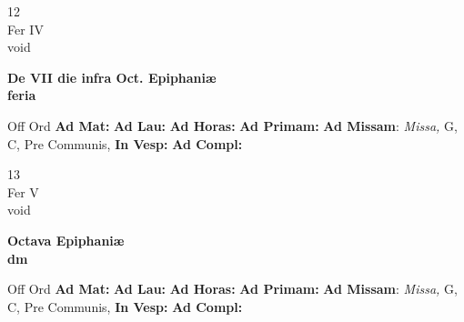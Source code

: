 \documentclass[10pt, openany]{book}
\begin{document}
    \begin{center}
        \begin{minipage}{3.5in}
            \vspace{2em}
            \begin{minipage}{0.5in}
                {\Huge 12} \\
                {\normalsize Fer IV} \\
                {\normalsize void}
            \end{minipage}
            \begin{minipage}{3.0in}
                \textbf{ \large De VII die infra Oct. Epiphaniæ \\
                \textnormal{\normalsize feria}} \\ 
            \end{minipage}
            \begin{justify}Off Ord
                \textbf{Ad Mat: }
                \textbf{Ad Lau: }
                \textbf{Ad Horas: }
                \textbf{Ad Primam: }\textbf{Ad Missam}: \textit{Missa,} G, C, Pre Communis,  
                \textbf{In Vesp: }
                \textbf{Ad Compl: }
            \end{justify}
        \end{minipage}
    \end{center}

    \begin{center}
        \begin{minipage}{3.5in}
            \vspace{2em}
            \begin{minipage}{0.5in}
                {\Huge 13} \\
                {\normalsize Fer V} \\
                {\normalsize void}
            \end{minipage}
            \begin{minipage}{3.0in}
                \textbf{ \large Octava Epiphaniæ \\
                \textnormal{\normalsize dm}} \\ 
            \end{minipage}
            \begin{justify}Off Ord
                \textbf{Ad Mat: }
                \textbf{Ad Lau: }
                \textbf{Ad Horas: }
                \textbf{Ad Primam: }\textbf{Ad Missam}: \textit{Missa,} G, C, Pre Communis,  
                \textbf{In Vesp: }
                \textbf{Ad Compl: }
            \end{justify}
        \end{minipage}
    \end{center}
\end{document}
